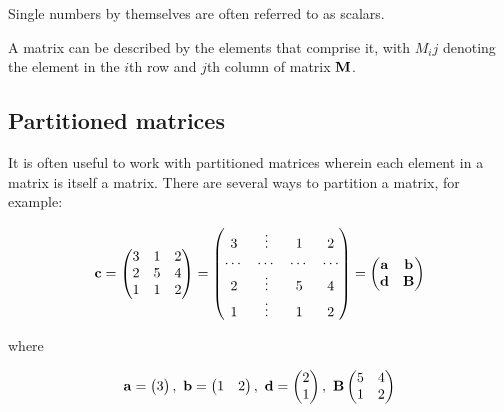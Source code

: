 \documentclass[
]{book}
\begin{document}
Single numbers by themselves are often referred to as scalars.

A matrix can be described by the elements that comprise it, with \(M_ij\) denoting the element in the \(i\)th row and \(j\)th column of matrix \(\mathbf{M}\).

\hypertarget{partitioned-matrices}{%
\subsection{Partitioned matrices}\label{partitioned-matrices}}

It is often useful to work with partitioned matrices wherein each element in a matrix is itself a matrix. There are several ways to partition a matrix, for example:

\begin{equation}
    \mathbf{c} = 
    \begin{pmatrix}
        3 & 1 & 2 \\
        2 & 5 & 4 \\
        1 & 1 & 2
    \end{pmatrix}
    =
    \begin{pmatrix}
        3 & \vdots & 1 & 2 \\
        \dots & \dots & \dots & \dots \\
        2 & \vdots & 5 & 4 \\
        1 & \vdots & 1 & 2
    \end{pmatrix}
    =
    \begin{pmatrix}
        \mathbf{a} & \mathbf{b} \\
        \mathbf{d} & \mathbf{B}
    \end{pmatrix}
    \notag
\end{equation}

where

\begin{equation}
    \mx{a} = 
    \begin{pmatrix}
        3
    \end{pmatrix}
    ,\  
    \mx{b} = 
    \begin{pmatrix}
        1 & 2
    \end{pmatrix}
    ,\ 
    \mx{d} = 
    \begin{pmatrix}
        2 \\
        1
    \end{pmatrix}
    ,\ 
    \mx{B}
    \begin{pmatrix}
        5 & 4 \\
        1 & 2
    \end{pmatrix}
    \notag
\end{equation}
\end{document}
